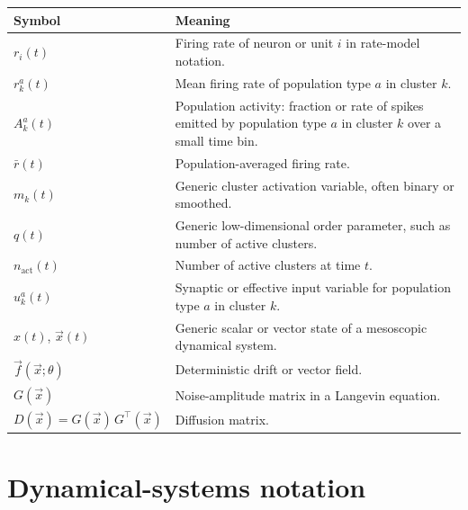 \begin{tabularx}{\textwidth}{@{}p{}X@{}}
\toprule
\textbf{Symbol} & \textbf{Meaning} \\
\midrule
$r_i(t)$ & Firing rate of neuron or unit $i$ in rate-model notation. \\
$r_k^a(t)$ & Mean firing rate of population type $a$ in cluster $k$. \\
$A_k^a(t)$ & Population activity: fraction or rate of spikes emitted by population type $a$ in cluster $k$ over a small time bin. \\
$\bar r(t)$ & Population-averaged firing rate. \\
$m_k(t)$ & Generic cluster activation variable, often binary or smoothed. \\
$q(t)$ & Generic low-dimensional order parameter, such as number of active clusters. \\
$n_{\mathrm{act}}(t)$ & Number of active clusters at time $t$. \\
$u_k^a(t)$ & Synaptic or effective input variable for population type $a$ in cluster $k$. \\
$x(t)$, $\vec{x}(t)$ & Generic scalar or vector state of a mesoscopic dynamical system. \\
$\vec{f}(\vec{x};\theta)$ & Deterministic drift or vector field. \\
$G(\vec{x})$ & Noise-amplitude matrix in a Langevin equation. \\
$D(\vec{x})=G(\vec{x})\,G^\top(\vec{x})$ & Diffusion matrix. \\
\bottomrule
\end{tabularx}

\section{Dynamical-systems notation}
\label{app:notation-dynamics}

